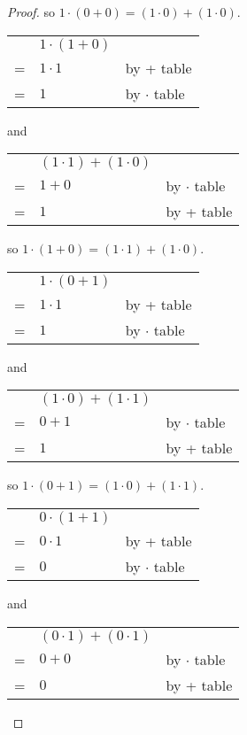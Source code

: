 \documentclass[14pt]{extarticle}
\newcommand{\cy}{\color{cyan}}
\begin{document}
\begin{proof}
  so \(1 \cdot (0 + 0) = (1 \cdot 0) + (1 \cdot 0)\).

  \begin{tabular}{cll}
      & \(1 \cdot (1 + 0)\) &                        \\
    = & \(1 \cdot 1\)       & {\cy by + table}       \\
    = & \(1\)               & {\cy by $\cdot$ table}
  \end{tabular}
  and
  \begin{tabular}{cll}
      & \((1 \cdot 1) + (1 \cdot 0)\) &                        \\
    = & \(1 + 0\)                     & {\cy by $\cdot$ table} \\
    = & \(1\)                         & {\cy by + table}
  \end{tabular}

  so \(1 \cdot (1 + 0) = (1 \cdot 1) + (1 \cdot 0)\).

  \begin{tabular}{cll}
      & \(1 \cdot (0 + 1)\) &                        \\
    = & \(1 \cdot 1\)       & {\cy by + table}       \\
    = & \(1\)               & {\cy by $\cdot$ table}
  \end{tabular}
  and
  \begin{tabular}{cll}
      & \((1 \cdot 0) + (1 \cdot 1)\) &                        \\
    = & \(0 + 1\)                     & {\cy by $\cdot$ table} \\
    = & \(1\)                         & {\cy by + table}
  \end{tabular}

  so \(1 \cdot (0 + 1) = (1 \cdot 0) + (1 \cdot 1)\).

  \begin{tabular}{cll}
      & \(0 \cdot (1 + 1)\) &                        \\
    = & \(0 \cdot 1\)       & {\cy by + table}       \\
    = & \(0\)               & {\cy by $\cdot$ table}
  \end{tabular}
  and
  \begin{tabular}{cll}
      & \((0 \cdot 1) + (0 \cdot 1)\) &                        \\
    = & \(0 + 0\)                     & {\cy by $\cdot$ table} \\
    = & \(0\)                         & {\cy by + table}
  \end{tabular}


\end{proof}
\end{document}
